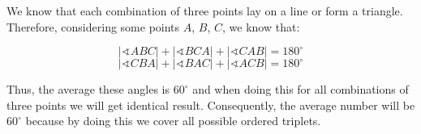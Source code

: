 \documentclass{fkssolpub}
\author{Ondřej Sedláček}
\renewcommand{\angle}{\sphericalangle}
\begin{document}
We know that each combination of three points lay on a line or form a triangle. Therefore, considering some points $A$, $B$, $C$, we know that:

\[
  |\angle ABC| + |\angle BCA| + |\angle CAB| = 180^{\circ}
\]
\[
  |\angle CBA| + |\angle BAC| + |\angle ACB| = 180^{\circ}
\]

Thus, the average these angles is $60^{\circ}$ and when doing this for all combinations of three points we will get identical result. Consequently, the average number will be $60^{\circ}$ because by doing this we cover all possible ordered triplets.
\end{document}
